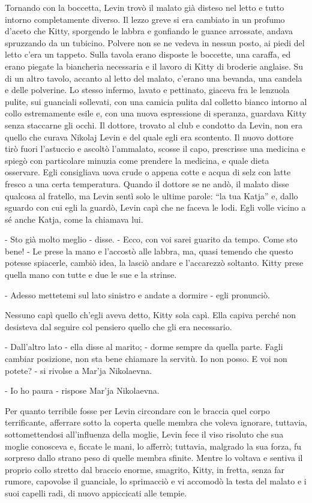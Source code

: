 Tornando con la boccetta, Levin trovò il malato già disteso nel letto e tutto intorno completamente diverso. Il lezzo greve si era cambiato in un profumo d'aceto che Kitty, sporgendo le labbra e gonfiando le guance arrossate, andava spruzzando da un tubicino. Polvere non se ne vedeva in nessun posto, ai piedi del letto c'era un tappeto. Sulla tavola erano disposte le boccette, una caraffa, ed erano piegate la biancheria necessaria e il lavoro di Kitty di broderie anglaise. Su di un altro tavolo, accanto al letto del malato, c'erano una bevanda, una candela e delle polverine. Lo stesso infermo, lavato e pettinato, giaceva fra le lenzuola pulite, sui guanciali sollevati, con una camicia pulita dal colletto bianco intorno al collo estremamente esile e, con una nuova espressione di speranza, guardava Kitty senza staccarne gli occhi. Il dottore, trovato al club e condotto da Levin, non era quello che curava Nikolaj Levin e del quale egli era scontento. Il nuovo dottore tirò fuori l'astuccio e ascoltò l'ammalato, scosse il capo, prescrisse una medicina e spiegò con particolare minuzia come prendere la medicina, e quale dieta osservare. Egli consigliava uova crude o appena cotte e acqua di selz con latte fresco a una certa temperatura. Quando il dottore se ne andò, il malato disse qualcosa al fratello, ma Levin sentì solo le ultime parole: ``la tua Katja'' e, dallo sguardo con cui egli la guardò, Levin capì che ne faceva le lodi. Egli volle vicino a sé anche Katja, come la chiamava lui. 

- Sto già molto meglio - disse. - Ecco, con voi sarei guarito da tempo. Come sto bene! - Le prese la mano e l'accostò alle labbra, ma, quasi temendo che questo potesse spiacerle, cambiò idea, la lasciò andare e l'accarezzò soltanto. Kitty prese quella mano con tutte e due le sue e la strinse. 

- Adesso mettetemi sul lato sinistro e andate a dormire - egli pronunciò. 

Nessuno capì quello ch'egli aveva detto, Kitty sola capì. Ella capiva perché non desisteva dal seguire col pensiero quello che gli era necessario. 

- Dall'altro lato - ella disse al marito; - dorme sempre da quella parte. Fagli cambiar posizione, non sta bene chiamare la servitù. Io non posso. E voi non potete? - si rivolse a Mar'ja Nikolaevna. 

- Io ho paura - rispose Mar'ja Nikolaevna. 

Per quanto terribile fosse per Levin circondare con le braccia quel corpo terrificante, afferrare sotto la coperta quelle membra che voleva ignorare, tuttavia, sottomettendosi all'influenza della moglie, Levin fece il viso risoluto che sua moglie conosceva e, ficcate le mani, lo afferrò; tuttavia, malgrado la sua forza, fu sorpreso dallo strano peso di quelle membra sfinite. Mentre lo voltava e sentiva il proprio collo stretto dal braccio enorme, smagrito, Kitty, in fretta, senza far rumore, capovolse il guanciale, lo sprimacciò e vi accomodò la testa del malato e i suoi capelli radi, di nuovo appiccicati alle tempie. 

